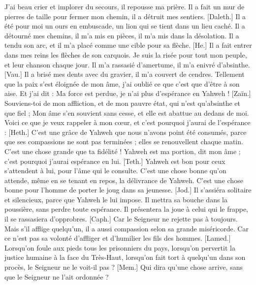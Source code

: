 \begin{multicols}{2}
J'ai beau crier et implorer du secours, il repousse ma prière.
Il a fait un mur de pierres de taille pour fermer mon chemin, il a détruit mes sentiers.
[Daleth.] Il a été pour moi un ours en embuscade, un lion qui se tient dans un lieu caché.
Il a détourné mes chemins, il m’a mis en pièces, il m’a mis dans la désolation.
Il a tendu son arc, et il m’a placé comme une cible pour sa flèche.
[He.] Il a fait entrer dans mes reins les flèches de son carquois.
Je suis la risée pour tout mon peuple, et leur chanson chaque jour.
Il m’a rassasié d’amertume, il m’a enivré d’absinthe.
[Vau.] Il a brisé mes dents avec du gravier, il m’a couvert de cendres.
Tellement que la paix s’est éloignée de mon âme, j’ai oublié ce que c’est que d’être à son aise.
Et j’ai dit : Ma force est perdue, je n'ai plus d'espérance en Yahweh !
[Zaïn.] Souviens-toi de mon affliction, et de mon pauvre état, qui n’est qu’absinthe et que fiel ;
Mon âme s’en souvient sans cesse, et elle est abattue au dedans de moi.
Voici ce que je veux rappeler à mon cœur, et c’est pourquoi j’aurai de l'espérance :
[Heth.] C’est une grâce de Yahweh que nous n’avons point été consumés, parce que ses compassions ne sont pas terminées ;
elles se renouvellent chaque matin. C’est une chose grande que ta fidélité !
Yahweh est ma portion, dit mon âme ; c’est pourquoi j’aurai espérance en lui.
[Teth.] Yahweh est bon pour ceux s’attendent à lui, pour l’âme qui le consulte.
C’est une chose bonne qu’on attende, même en se tenant en repos, la délivrance de Yahweh.
C’est une chose bonne pour l’homme de porter le joug dans sa jeunesse.
[Jod.] Il s'assiéra solitaire et silencieux, parce que Yahweh le lui impose.
Il mettra sa bouche dans la poussière, sans perdre toute espérance.
Il présentera la joue à celui qui le frappe, il se rassasiera d’opprobres.
[Caph.] Car le Seigneur ne rejette pas à toujours.
Mais s’il afflige quelqu’un, il a aussi compassion selon sa grande miséricorde.
Car ce n’est pas sa volonté d'affliger et d'humilier les fils des hommes.
[Lamed.] Lorsqu’on foule aux pieds tous les prisonniers du pays,
lorsqu’on pervertit la justice humaine à la face du Très-Haut,
lorsqu’on fait tort à quelqu’un dans son procès, le Seigneur ne le voit-il pas ?
[Mem.] Qui dira qu'une chose arrive, sans que le Seigneur ne l’ait ordonnée ?

\end{multicols}
